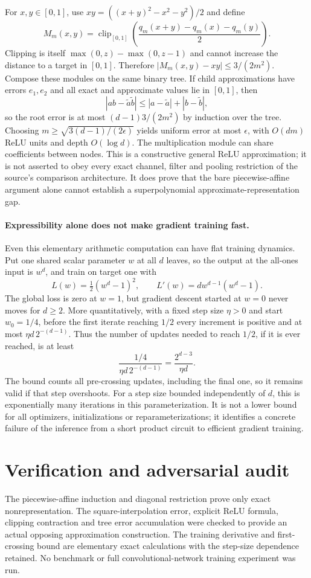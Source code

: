 \documentclass[11pt]{article}
\begin{document}
For $x,y\in[0,1]$, use $xy=((x+y)^2-x^2-y^2)/2$ and define
\[
 M_m(x,y)=\operatorname{clip}_{[0,1]}
      \left(\frac{q_m(x+y)-q_m(x)-q_m(y)}2\right).
\]
Clipping is itself $\max(0,z)-\max(0,z-1)$ and cannot increase the distance to a target in $[0,1]$. Therefore $|M_m(x,y)-xy|\le3/(2m^2)$. Compose these modules on the same binary tree. If child approximations have errors $e_1,e_2$ and all exact and approximate values lie in $[0,1]$, then
\[
 |ab-\widetilde a\widetilde b|
 \le|a-\widetilde a|+|b-\widetilde b|,
\]
so the root error is at most $(d-1)3/(2m^2)$ by induction over the tree. Choosing $m\ge\sqrt{3(d-1)/(2\epsilon)}$ yields uniform error at most $\epsilon$, with $O(dm)$ ReLU units and depth $O(\log d)$. The multiplication module can share coefficients between nodes. This is a constructive general ReLU approximation; it is not asserted to obey every exact channel, filter and pooling restriction of the source's comparison architecture. It does prove that the bare piecewise-affine argument alone cannot establish a superpolynomial approximate-representation gap.

\paragraph{Expressibility alone does not make gradient training fast.}
Even this elementary arithmetic computation can have flat training dynamics. Put one shared scalar parameter $w$ at all $d$ leaves, so the output at the all-ones input is $w^d$, and train on target one with
\[
 L(w)=\tfrac12(w^d-1)^2,\qquad L'(w)=d w^{d-1}(w^d-1).
\]
The global loss is zero at $w=1$, but gradient descent started at $w=0$ never moves for $d\ge2$. More quantitatively, with a fixed step size $\eta>0$ and start $w_0=1/4$, before the first iterate reaching $1/2$ every increment is positive and at most $\eta d\,2^{-(d-1)}$. Thus the number of updates needed to reach $1/2$, if it is ever reached, is at least
\[
 \frac{1/4}{\eta d\,2^{-(d-1)}}=\frac{2^{d-3}}{\eta d}.
\]
The bound counts all pre-crossing updates, including the final one, so it remains valid if that step overshoots. For a step size bounded independently of $d$, this is exponentially many iterations in this parameterization. It is not a lower bound for all optimizers, initializations or reparameterizations; it identifies a concrete failure of the inference from a short product circuit to efficient gradient training.
\section{Verification and adversarial audit}
The piecewise-affine induction and diagonal restriction prove only exact nonrepresentation. The square-interpolation error, explicit ReLU formula, clipping contraction and tree error accumulation were checked to provide an actual opposing approximation construction. The training derivative and first-crossing bound are elementary exact calculations with the step-size dependence retained. No benchmark or full convolutional-network training experiment was run.
\end{document}
